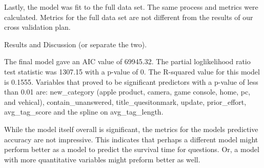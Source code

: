 \documentclass[12pt]{article}
\begin{document}
Lastly, the model was fit to the full data set. The same process and metrics were calculated. Metrics for the full data set are not different from the results of our cross validation plan. 

Results and Discussion (or separate the two). 

The final model gave an AIC value of 69945.32. The partial loglikelihood ratio test statistic was 1307.15 with a p-value of 0. The R-squared value for this model is 0.1555. Variables that proved to be significant predictors with a p-value of less than 0.01 are: new_category (apple product, camera, game console, home, pc, and vehical), contain_unanswered, title_quesitonmark, update, prior_effort, avg_tag_score and the spline on avg_tag_length. 

While the model itself overall is significant, the metrics for the models predictive accuracy are not impressive. This indicates that perhaps a different model might perform better as a model to predict the survival time for questions. Or, a model with more quantitative variables might preform better as well.  





\end{document}
